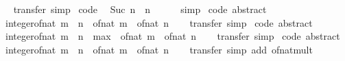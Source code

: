 \begin{isabellebody}
%
\isadelimproof
\ \ %
\endisadelimproof
%
\isatagproof
{}\isamarkupfalse%
\ transfer\ simp%
\endisatagproof
{\isafoldproof}%
%
\isadelimproof
\isanewline
%
\endisadelimproof
\isanewline
{}\isamarkupfalse%
\ {\isacharbrackleft}code{\isacharbrackright}{\isacharcolon}\isanewline
\ \ {\isachardoublequoteopen}Suc\ n\ {\isacharequal}\ n\ {\isacharplus}\ {}{\isachardoublequoteclose}\isanewline
%
\isadelimproof
\ \ %
\endisadelimproof
%
\isatagproof
{}\isamarkupfalse%
\ simp%
\endisatagproof
{\isafoldproof}%
%
\isadelimproof
\isanewline
%
\endisadelimproof
\isanewline
{}\isamarkupfalse%
\ {\isacharbrackleft}code\ abstract{\isacharbrackright}{\isacharcolon}\isanewline
\ \ {\isachardoublequoteopen}integer{\isacharunderscore}of{\isacharunderscore}nat\ {\isacharparenleft}m\ {\isacharplus}\ n{\isacharparenright}\ {\isacharequal}\ of{\isacharunderscore}nat\ m\ {\isacharplus}\ of{\isacharunderscore}nat\ n{\isachardoublequoteclose}\isanewline
%
\isadelimproof
\ \ %
\endisadelimproof
%
\isatagproof
{}\isamarkupfalse%
\ transfer\ simp%
\endisatagproof
{\isafoldproof}%
%
\isadelimproof
\isanewline
%
\endisadelimproof
\isanewline
{}\isamarkupfalse%
\ {\isacharbrackleft}code\ abstract{\isacharbrackright}{\isacharcolon}\isanewline
\ \ {\isachardoublequoteopen}integer{\isacharunderscore}of{\isacharunderscore}nat\ {\isacharparenleft}m\ {\isacharminus}\ n{\isacharparenright}\ {\isacharequal}\ max\ {}\ {\isacharparenleft}of{\isacharunderscore}nat\ m\ {\isacharminus}\ of{\isacharunderscore}nat\ n{\isacharparenright}{\isachardoublequoteclose}\isanewline
%
\isadelimproof
\ \ %
\endisadelimproof
%
\isatagproof
{}\isamarkupfalse%
\ transfer\ simp%
\endisatagproof
{\isafoldproof}%
%
\isadelimproof
\isanewline
%
\endisadelimproof
\isanewline
{}\isamarkupfalse%
\ {\isacharbrackleft}code\ abstract{\isacharbrackright}{\isacharcolon}\isanewline
\ \ {\isachardoublequoteopen}integer{\isacharunderscore}of{\isacharunderscore}nat\ {\isacharparenleft}m\ {\isacharasterisk}\ n{\isacharparenright}\ {\isacharequal}\ of{\isacharunderscore}nat\ m\ {\isacharasterisk}\ of{\isacharunderscore}nat\ n{\isachardoublequoteclose}\isanewline
%
\isadelimproof
\ \ %
\endisadelimproof
%
\isatagproof
{}\isamarkupfalse%
\ transfer\ {\isacharparenleft}simp\ add{\isacharcolon}\ of{\isacharunderscore}nat{\isacharunderscore}mult{\isacharparenright}%
\endisatagproof
{\isafoldproof}%
%
\isadelimproof
\isanewline
%
\endisadelimproof
\isanewline
{}\isamarkupfalse%

\end{isabellebody}
